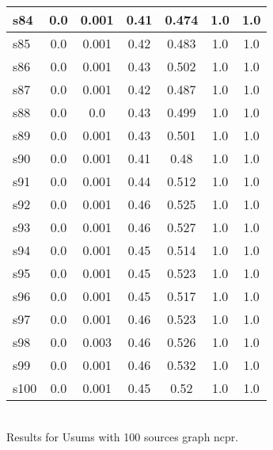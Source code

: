 \documentclass{article}
\begin{document}
\begin{tabular}{|l|c|c|c|c|c|c|}
\hline
s84 &0.0 & 0.001 & 0.41 & 0.474 & 1.0 & 1.0\\
\hline
s85 &0.0 & 0.001 & 0.42 & 0.483 & 1.0 & 1.0\\
\hline
s86 &0.0 & 0.001 & 0.43 & 0.502 & 1.0 & 1.0\\
\hline
s87 &0.0 & 0.001 & 0.42 & 0.487 & 1.0 & 1.0\\
\hline
s88 &0.0 & 0.0 & 0.43 & 0.499 & 1.0 & 1.0\\
\hline
s89 &0.0 & 0.001 & 0.43 & 0.501 & 1.0 & 1.0\\
\hline
s90 &0.0 & 0.001 & 0.41 & 0.48 & 1.0 & 1.0\\
\hline
s91 &0.0 & 0.001 & 0.44 & 0.512 & 1.0 & 1.0\\
\hline
s92 &0.0 & 0.001 & 0.46 & 0.525 & 1.0 & 1.0\\
\hline
s93 &0.0 & 0.001 & 0.46 & 0.527 & 1.0 & 1.0\\
\hline
s94 &0.0 & 0.001 & 0.45 & 0.514 & 1.0 & 1.0\\
\hline
s95 &0.0 & 0.001 & 0.45 & 0.523 & 1.0 & 1.0\\
\hline
s96 &0.0 & 0.001 & 0.45 & 0.517 & 1.0 & 1.0\\
\hline
s97 &0.0 & 0.001 & 0.46 & 0.523 & 1.0 & 1.0\\
\hline
s98 &0.0 & 0.003 & 0.46 & 0.526 & 1.0 & 1.0\\
\hline
s99 &0.0 & 0.001 & 0.46 & 0.532 & 1.0 & 1.0\\
\hline
s100 &0.0 & 0.001 & 0.45 & 0.52 & 1.0 & 1.0\\
\hline
\end{tabular}\\

\noindent Results for Usums with 100 sources graph ncpr.
\end{document}
